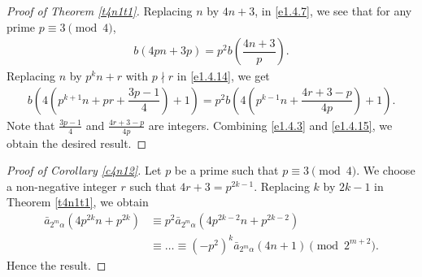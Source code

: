 \documentclass[11pt,a4paper]{article}
\numberwithin{equation}{section}
\theoremstyle{plain}
\begin{document}
\begin{proof}[Proof of Theorem \ref{t4n1t1}\unskip]
		Replacing $n$ by $4n+3$, in \eqref{e1.4.7}, we see that for any prime $p\equiv 3\pmod 4$,
	\begin{align}\label{e1.4.14}
		b(4pn+3p)=p^2b\left(\dfrac{4n+3}{p}\right).
	\end{align}
	Replacing $n$ by $p^kn+r$ with $p\nmid r$ in \eqref{e1.4.14}, we get
	\begin{align}\label{e1.4.15}
	b\left(4\left(p^{k+1}n+pr+\dfrac{3p-1}{4}\right)+1\right)=p^2b\left(4\left(p^{k-1}n+\dfrac{4r+3-p}{4p}\right)+1\right).
	\end{align}
	Note that $\frac{3p-1}{4}$ and $\frac{4r+3-p}{4p}$ are integers. Combining \eqref{e1.4.3} and \eqref{e1.4.15}, we obtain the desired result.
\end{proof}
\begin{proof}[Proof of Corollary \ref{c4n12}\unskip]
Let $p$ be a prime such that $p\equiv 3\pmod 4$. 	We choose a non-negative integer $r$ such that $4r+3=p^{2k-1}$. Replacing $k$ by $2k-1$ in Theorem \ref{t4n1t1}, we obtain
\begin{align*}
\bar{a}_{2^m\alpha}\left(4p^{2k}n+p^{2k}\right)&\equiv p^2\bar{a}_{2^m\alpha}(4p^{2k-2}n+p^{2k-2})\\
&\equiv\hdots\equiv (-p^2)^{k}\bar{a}_{2^m\alpha}(4n+1)\pmod{2^{m+2}}.
\end{align*}
Hence the result.
\end{proof}
\end{document}
